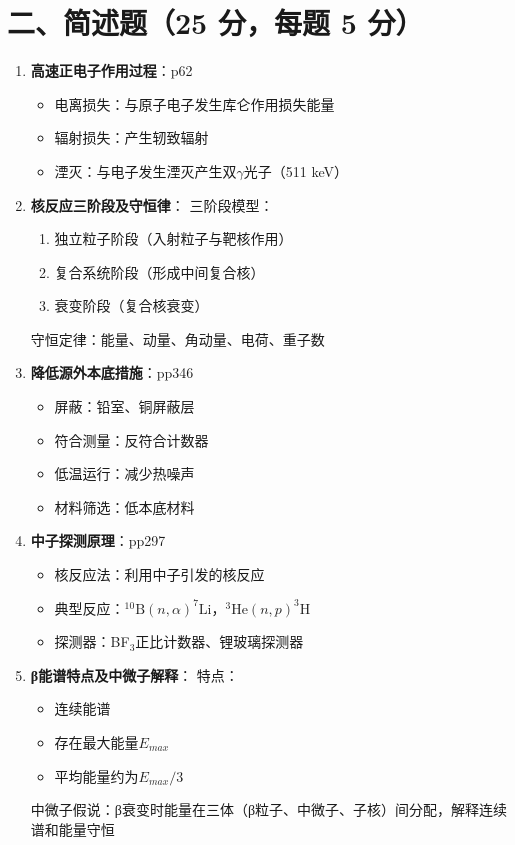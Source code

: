 \documentclass{article}
\begin{document}
\section*{二、简述题（25 分，每题 5 分）}
\begin{enumerate}
    \item \textbf{高速正电子作用过程}：p62
    \begin{itemize}
        \item 电离损失：与原子电子发生库仑作用损失能量
        \item 辐射损失：产生轫致辐射
        \item 湮灭：与电子发生湮灭产生双$\gamma$光子（511 keV）
    \end{itemize}
    
    \item \textbf{核反应三阶段及守恒律}：
    三阶段模型：
    \begin{enumerate}
        \item 独立粒子阶段（入射粒子与靶核作用）
        \item 复合系统阶段（形成中间复合核）
        \item 衰变阶段（复合核衰变）
    \end{enumerate}
    守恒定律：能量、动量、角动量、电荷、重子数
    
    \item \textbf{降低源外本底措施}：pp346
    \begin{itemize}
        \item 屏蔽：铅室、铜屏蔽层
        \item 符合测量：反符合计数器
        \item 低温运行：减少热噪声
        \item 材料筛选：低本底材料
    \end{itemize}
    
    \item \textbf{中子探测原理}：pp297
    \begin{itemize}
        \item 核反应法：利用中子引发的核反应
        \item 典型反应：$^{10}\mathrm{B}(n,\alpha)^{7}\mathrm{Li}$，$^{3}\mathrm{He}(n,p)^{3}\mathrm{H}$
        \item 探测器：BF$_3$正比计数器、锂玻璃探测器
    \end{itemize}
    
    \item \textbf{β能谱特点及中微子解释}：
    特点：
    \begin{itemize}
        \item 连续能谱
        \item 存在最大能量$E_{max}$
        \item 平均能量约为$E_{max}/3$
    \end{itemize}
    中微子假说：β衰变时能量在三体（β粒子、中微子、子核）间分配，解释连续谱和能量守恒
\end{enumerate}
\end{document}
